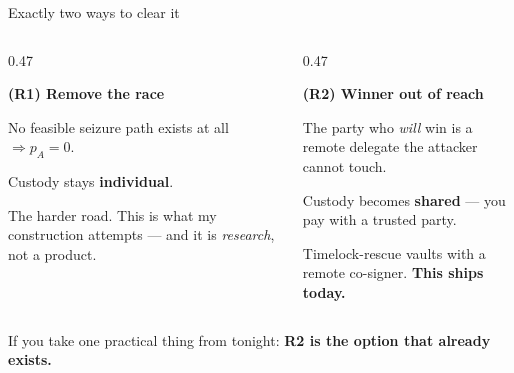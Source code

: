 \documentclass[aspectratio=169,12pt]{beamer}
\newcommand{\punch}[1]{{\color{accentdark}\bfseries #1}}
\begin{document}
\begin{frame}[t]{Exactly two ways to clear it}
  \vspace{0.39em}
  \begin{columns}[T]
    \begin{column}{0.47\textwidth}
      {\color{accentdark}\large\bfseries (R1) Remove the race\par}
      \vspace{0.22em}
      {\small No feasible seizure path exists at all $\Rightarrow p_A = 0$.\par}
      \vspace{0.33em}
      {\small Custody stays \textbf{individual}.\par}
      \vspace{0.33em}
      {\footnotesize\color{graytext} The harder road. This is what my construction
       attempts --- and it is \emph{research}, not a product.\par}
    \end{column}
    \begin{column}{0.47\textwidth}
      {\color{accentdark}\large\bfseries (R2) Winner out of reach\par}
      \vspace{0.22em}
      {\small The party who \emph{will} win is a remote delegate the attacker
       cannot touch.\par}
      \vspace{0.33em}
      {\small Custody becomes \textbf{shared} --- you pay with a trusted party.\par}
      \vspace{0.33em}
      {\footnotesize\color{graytext} Timelock-rescue vaults with a remote
       co-signer. \textbf{This ships today.}\par}
    \end{column}
  \end{columns}
  \vfill
  {\small If you take one practical thing from tonight: \punch{R2 is the option
   that already exists.}}
  \vspace{0.22em}
\end{frame}
\end{document}

